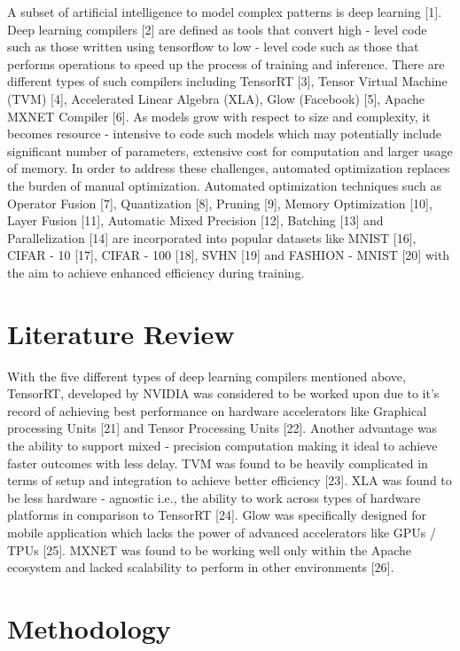 \documentclass[sigconf]{acmart}
\begin{document}
A subset of artificial intelligence to model complex patterns is deep learning [1]. Deep learning compilers [2] are defined as tools that convert high - level code such as those written using tensorflow to low - level code such as those that performs operations to speed up the process of training and inference. There are different types of such compilers including TensorRT [3], Tensor Virtual Machine (TVM) [4], Accelerated Linear Algebra (XLA), Glow (Facebook) [5], Apache MXNET Compiler [6]. As models grow with respect to size and complexity, it becomes resource - intensive to code such models which may potentially include significant number of parameters, extensive cost for computation and larger usage of memory. In order to address these challenges, automated optimization replaces the burden of manual optimization. Automated optimization techniques such as Operator Fusion [7], Quantization [8], Pruning [9], Memory Optimization [10], Layer Fusion [11],  Automatic Mixed Precision [12], Batching [13] and Parallelization [14] are incorporated into popular datasets like MNIST [16], CIFAR - 10 [17], CIFAR - 100 [18], SVHN [19] and FASHION - MNIST [20] with the aim to achieve enhanced efficiency during training.


\section{Literature Review}
With the five different types of deep learning compilers mentioned above, TensorRT, developed by NVIDIA was considered to be worked upon due to it's record of achieving best performance on hardware accelerators like Graphical processing Units [21] and Tensor Processing Units [22]. Another advantage was the ability to support mixed - precision computation making it ideal to achieve faster outcomes with less delay. TVM was found to be heavily complicated in terms of setup and integration to achieve better efficiency [23]. XLA was found to be less hardware - agnostic i.e., the ability to work across types of hardware platforms in comparison to TensorRT [24]. Glow was specifically designed for mobile application which lacks the power of advanced accelerators like GPUs / TPUs [25]. MXNET was found to be working well only within the Apache ecosystem and lacked scalability to perform in other environments [26]. 

\section {Methodology}
\end{document}
